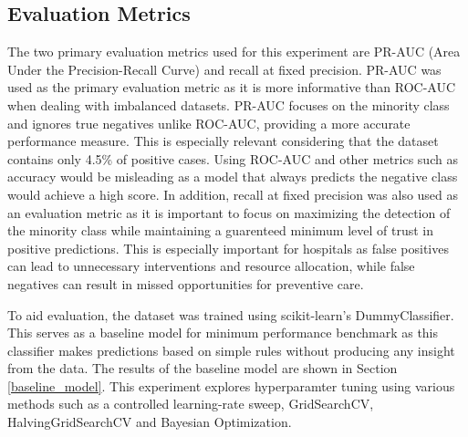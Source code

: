 \subsection{Evaluation Metrics}

The two primary evaluation metrics used for this experiment are PR-AUC (Area Under the Precision-Recall Curve) and recall at fixed precision. PR-AUC was used as the primary evaluation metric as it is more informative 
than ROC-AUC when dealing with imbalanced datasets. PR-AUC focuses on the minority class and ignores true negatives unlike ROC-AUC, providing a more accurate performance measure.
This is especially relevant considering that the dataset contains only 4.5\% of positive cases. Using ROC-AUC and other metrics such as accuracy would be misleading as a model 
that always predicts the negative class would achieve a high score. In addition, recall at fixed precision was also used as an evaluation metric as it 
is important to focus on maximizing the detection of the minority class while maintaining a guarenteed minimum level of trust in positive predictions. This is especially important
for hospitals as false positives can lead to unnecessary interventions and resource allocation, while false negatives can result in missed opportunities 
for preventive care.

To aid evaluation, the dataset was trained using scikit-learn's DummyClassifier. This serves as a baseline model for minimum performance benchmark as this classifier makes predictions
based on simple rules without producing any insight from the data. The results of the baseline model are shown in Section \ref{baseline_model}. This experiment explores
hyperparamter tuning using various methods such as a controlled learning-rate sweep, GridSearchCV, HalvingGridSearchCV and Bayesian Optimization.
